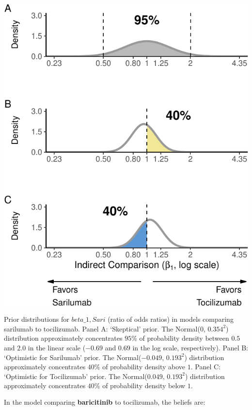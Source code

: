 \documentclass[
  12pt,
]{article}
\begin{document}
\begin{center}\includegraphics{supplementary_material_files/figure-latex/all priors sari meta regressions-1} \end{center}

Prior distributions for \(beta\_{1, Sari}\) (ratio of odds ratios) in
models comparing sarilumab to tocilizumab. Panel A: `Skeptical' prior.
The Normal(\(0\), \(0.354^2\)) distribution approximately concentrates
\(95\)\% of probability density between \(0.5\) and \(2.0\) in the
linear scale (\(-0.69\) and \(0.69\) in the log scale, respectively).
Panel B: `Optimistic for Sarilumab' prior. The Normal(\(-0.049\),
\(0.193^2\)) distribution approximately concentrates \(40\)\% of
probability density above \(1\). Panel C: `Optimistic for Tocilizumab'
prior. The Normal(\(0.049\), \(0.193^2\)) distribution approximately
concentrates \(40\)\% of probability density below \(1\).

\newpage

In the model comparing \textbf{baricitinib} to tocilizumab, the beliefs
are:
\end{document}
